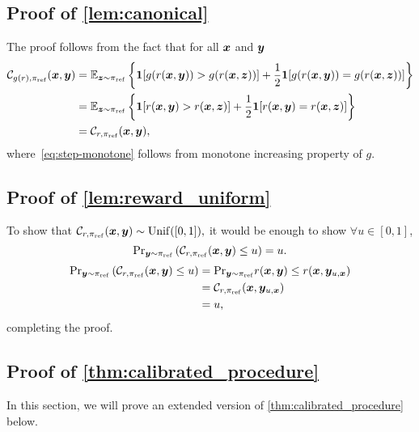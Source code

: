\subsection{Proof of \cref{lem:canonical}}
The proof follows from the fact that for all ${\bm{x}}$ and ${\bm{y}}$
\begin{align}
      \mathcal{C}_{g(r), {\pi_{\rm ref}}} ({\bm{x}}, {\bm{y}}) &= 
    \mathbb{E}_{{\bm{z}} \sim {\pi_{\rm ref}}} \left\{ \mathbf{1}[g(r({\bm{x}},{\bm{y}})) > g(r({\bm{x}},{\bm{z}}))] + \frac{1}{2}  \mathbf{1}[g(r({\bm{x}},{\bm{y}})) = g(r({\bm{x}},{\bm{z}}))]\right\} \nonumber \\
    & =\mathbb{E}_{{\bm{z}} \sim {\pi_{\rm ref}}} \left\{ \mathbf{1}[r({\bm{x}},{\bm{y}}) > r({\bm{x}},{\bm{z}})] + \frac{1}{2}  \mathbf{1}[r({\bm{x}},{\bm{y}}) = r({\bm{x}},{\bm{z}})]\right\} \label{eq:step-monotone}\\
      & = \mathcal{C}_{r, {\pi_{\rm ref}}} ({\bm{x}}, {\bm{y}}), \nonumber
\end{align}
where~\eqref{eq:step-monotone} follows from monotone increasing property of $g.$

\subsection{Proof of \cref{lem:reward_uniform}}

To show that $\mathcal{C}_{r, {\pi_{\rm ref}}}({\bm{x}}, {\bm{y}}) \sim {\rm Unif}([0, 1]),$ it would be enough to show $\forall u \in [0, 1]$,
\[
    \text{Pr}_{{\bm{y}} \sim {\pi_{\rm ref}}}\left(\mathcal{C}_{r, {\pi_{\rm ref}}}({\bm{x}}, {\bm{y}}) \le u\right) = u. 
\]
\begin{align*}
     \text{Pr}_{{\bm{y}} \sim {\pi_{\rm ref}}}\left(\mathcal{C}_{r, {\pi_{\rm ref}}}({\bm{x}}, {\bm{y}}) \le u\right) & =  \text{Pr}_{{\bm{y}} \sim {\pi_{\rm ref}}}{r({\bm{x}}, {\bm{y}}) \le r({\bm{x}}, {\bm{y}}_{u, {\bm{x}}})}  \\
     & = \mathcal{C}_{r, {\pi_{\rm ref}}}({\bm{x}}, {\bm{y}}_{u, {\bm{x}}}) \\
     & = u,
\end{align*}
completing the proof.


\subsection{Proof of \cref{thm:calibrated_procedure}}

In this section, we will prove an extended version of \cref{thm:calibrated_procedure} below.

